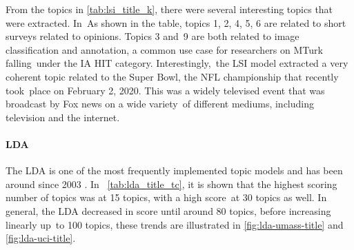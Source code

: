 \documentclass[letterpaper,12pt]{article}
\begin{document}
From the topics in \ref{tab:lsi_title_k}, there were several interesting topics that were extracted. In\
As shown in the table, topics 1, 2, 4, 5, 6 are related to short surveys related to opinions. Topics 3 and\
9 are both related to image classification and annotation, a common use case for researchers on MTurk falling\
under the IA HIT category. Interestingly,\
the LSI model extracted a very coherent topic related to the Super Bowl, the NFL championship that recently took\
place on February 2, 2020. This was a widely televised event that was broadcast by Fox news on a wide variety\
of different mediums, including television and the internet.
\newpage
\paragraph{LDA}

The LDA is one of the most frequently implemented topic models and has been around since 2003 \cite{blei2003latent}. In \
\ref{tab:lda_title_tc}, it is shown that the highest scoring number of topics was at 15 topics, with a high score\
at 30 topics as well. In general, the LDA decreased in score until around 80 topics, before increasing linearly up\
to 100 topics, these trends are illustrated in \ref{fig:lda-umass-title} and \ref{fig:lda-uci-title}.
\end{document}
